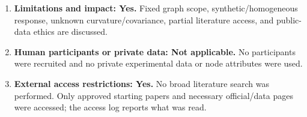 \documentclass{article}
\begin{document}
\begin{enumerate}[leftmargin=*,itemsep=1pt]
\item \textbf{Limitations and impact: Yes.} Fixed graph scope, synthetic/homogeneous response, unknown curvature/covariance, partial literature access, and public-data ethics are discussed.
\item \textbf{Human participants or private data: Not applicable.} No participants were recruited and no private experimental data or node attributes were used.
\item \textbf{External access restrictions: Yes.} No broad literature search was performed. Only approved starting papers and necessary official/data pages were accessed; the access log reports what was read.
\end{enumerate}
\end{document}
